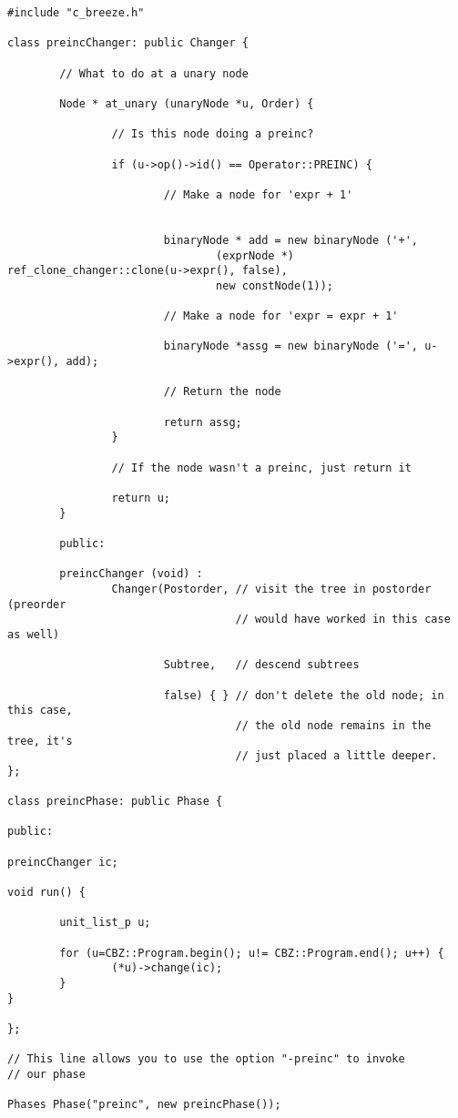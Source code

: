 \documentclass[10pt]{article}
\begin{document}
\begin{small}
\begin{verbatim}
#include "c_breeze.h"

class preincChanger: public Changer {

        // What to do at a unary node

        Node * at_unary (unaryNode *u, Order) {

                // Is this node doing a preinc?

                if (u->op()->id() == Operator::PREINC) {

                        // Make a node for 'expr + 1'


                        binaryNode * add = new binaryNode ('+',
                                (exprNode *) ref_clone_changer::clone(u->expr(), false),
                                new constNode(1));

                        // Make a node for 'expr = expr + 1'

                        binaryNode *assg = new binaryNode ('=', u->expr(), add);

                        // Return the node

                        return assg;
                }

                // If the node wasn't a preinc, just return it

                return u;
        }

        public:

        preincChanger (void) :
                Changer(Postorder, // visit the tree in postorder (preorder 
                                   // would have worked in this case as well)

                        Subtree,   // descend subtrees

                        false) { } // don't delete the old node; in this case, 
                                   // the old node remains in the tree, it's 
                                   // just placed a little deeper.
};

class preincPhase: public Phase {

public:

preincChanger ic;

void run() {

        unit_list_p u;

        for (u=CBZ::Program.begin(); u!= CBZ::Program.end(); u++) {
                (*u)->change(ic);
        }
}

};

// This line allows you to use the option "-preinc" to invoke
// our phase

Phases Phase("preinc", new preincPhase());
\end{verbatim}
\end{small}
\end{document}
